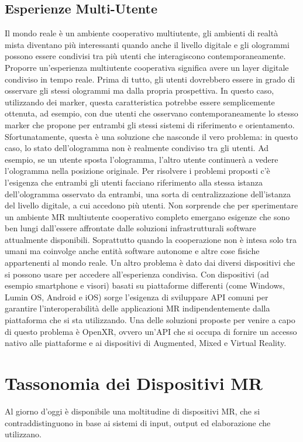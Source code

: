 \subsection{Esperienze Multi-Utente}
Il mondo reale è un ambiente cooperativo multiutente, gli ambienti di realtà mista diventano più interessanti quando anche il livello digitale e gli ologrammi possono essere condivisi tra più utenti che interagiscono contemporaneamente. Proporre un'esperienza multiutente cooperativa significa avere un layer digitale condiviso in tempo reale. Prima di tutto, gli utenti dovrebbero essere in grado di osservare gli stessi ologrammi ma dalla propria prospettiva. In questo caso, utilizzando dei marker, questa caratteristica potrebbe essere semplicemente ottenuta, ad esempio, con due utenti che osservano contemporaneamente lo stesso marker che propone per entrambi gli stessi sistemi di riferimento e orientamento. Sfortunatamente, questa è una soluzione che nasconde il vero problema: in questo caso, lo stato dell'ologramma non è realmente condiviso tra gli utenti. Ad esempio, se un utente sposta l'ologramma, l'altro utente continuerà a vedere l'ologramma nella posizione originale. Per risolvere i problemi proposti c'è l'esigenza che entrambi gli utenti facciano riferimento alla stessa istanza dell'ologramma osservato da entrambi, una sorta di centralizzazione dell'istanza del livello digitale, a cui accedono più utenti. Non sorprende che per sperimentare un ambiente MR multiutente cooperativo completo emergano esigenze che sono ben lungi dall'essere affrontate dalle soluzioni infrastrutturali software attualmente disponibili. Soprattutto quando la cooperazione non è intesa solo tra umani ma coinvolge anche entità software autonome e altre cose fisiche appartenenti al mondo reale.
Un altro problema è dato dai diversi dispositivi che si possono usare per accedere all'esperienza condivisa. Con dispositivi (ad esempio smartphone e visori) basati su piattaforme differenti (come Windows, Lumin OS, Android e iOS) sorge l'esigenza di sviluppare API comuni per garantire l'interoperabilità delle applicazioni MR indipendentemente dalla piattaforma che si sta utilizzando.
Una delle soluzioni proposte per venire a capo di questo problema è OpenXR, ovvero un'API che si occupa di fornire un accesso nativo alle piattaforme e ai dispositivi di
Augmented, Mixed e Virtual Reality.

\section{Tassonomia dei Dispositivi MR}\label{sec:Sezione1.4}
Al giorno d’oggi è disponibile una moltitudine di dispositivi MR, che si contraddistinguono in base ai sistemi di input, output ed elaborazione che utilizzano. 


